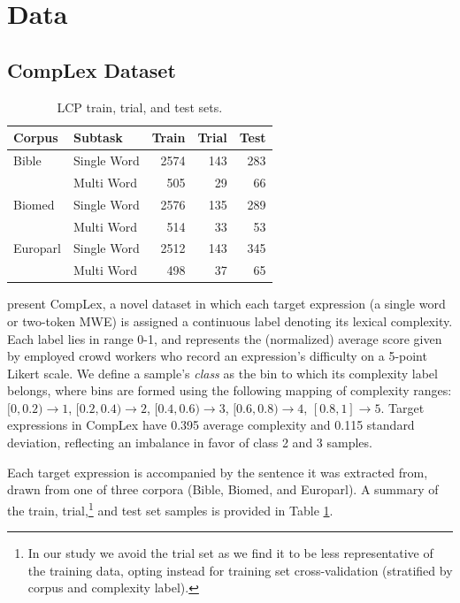 \documentclass[11pt,a4paper]{article}
\begin{document}
\section{Data}

\subsection{CompLex Dataset}

\begin{table}
  \centering
  \begin{tabular}{l|l|r|r|r}
    \hline
    \centering
    \textbf{Corpus} & \textbf{Subtask} & \textbf{Train} &  \textbf{Trial} &  \textbf{Test} \\
    \hline
    Bible & Single Word &   2574 &    143 &   283 \\
            & Multi Word &    505 &     29 &    66 \\
    \hline
    Biomed & Single Word &   2576 &    135 &   289 \\
            & Multi Word &    514 &     33 &    53 \\
    \hline
    Europarl & Single Word &   2512 &    143 &   345 \\
            & Multi Word &    498 &     37 &    65 \\
    \hline
  \end{tabular}
  \caption{\label{tab:datasets} LCP train, trial, and test sets.}
\end{table}

\citet{shardlow2020complex} present CompLex, a novel dataset in which each target expression (a single word or two-token MWE) is assigned a continuous label denoting its lexical complexity. Each label lies in range 0-1, and represents the (normalized) average score given by employed crowd workers who record an expression's difficulty on a 5-point Likert scale. We define a sample's \textit{class} as the bin to which its complexity label belongs, where bins are formed using the following mapping of complexity ranges: $[0,0.2) \rightarrow 1$, $[0.2, 0.4) \rightarrow 2$, $[0.4, 0.6) \rightarrow 3$, $[0.6, 0.8) \rightarrow 4$, $[0.8, 1] \rightarrow 5$. Target expressions in CompLex have 0.395 average complexity and 0.115 standard deviation, reflecting an imbalance in favor of class 2 and 3 samples. 

Each target expression is accompanied by the sentence it was extracted from, drawn from one of three corpora (Bible, Biomed, and Europarl). A summary of the train, trial,\footnote{In our study we avoid the trial set as we find it to be less representative of the training data, opting instead for training set cross-validation (stratified by corpus and complexity label).} and test set samples is provided in Table \ref{tab:datasets}.
\end{document}
